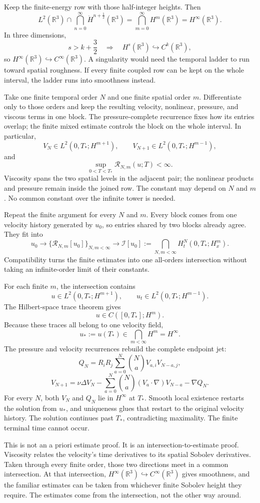\documentclass[11pt]{article}
\begin{document}
Keep the finite-energy row with those half-integer heights. Then
\[
L^2(\mathbb R^3)
\cap\bigcap_{n=0}^{\infty}\dot H^{n+\frac12}(\mathbb R^3)
=\bigcap_{m=0}^{\infty}H^m(\mathbb R^3)
=H^\infty(\mathbb R^3).
\]
In three dimensions,
\[
s>k+\frac32
\quad\Longrightarrow\quad
H^s(\mathbb R^3)\hookrightarrow C^k(\mathbb R^3),
\]
so \(H^\infty(\mathbb R^3)\hookrightarrow C^\infty(\mathbb R^3)\). A singularity would need the temporal ladder to run toward spatial roughness. If every finite coupled row can be kept on the whole interval, the ladder runs into smoothness instead.

Take one finite temporal order \(N\) and one finite spatial order \(m\). Differentiate only to those orders and keep the resulting velocity, nonlinear, pressure, and viscous terms in one block. The pressure-complete recurrence fixes how its entries overlap; the finite mixed estimate controls the block on the whole interval. In particular,
\[
V_N\in L^2(0,T_*;H^{m+1}),
\qquad
V_{N+1}\in L^2(0,T_*;H^{m-1}),
\]
and
\[
\sup_{0<T<T_*}\mathcal R_{N,m}(u;T)<\infty.
\]
Viscosity spans the two spatial levels in the adjacent pair; the nonlinear products and pressure remain inside the joined row. The constant may depend on \(N\) and \(m\). No common constant over the infinite tower is needed.

Repeat the finite argument for every \(N\) and \(m\). Every block comes from one velocity history generated by \(u_0\), so entries shared by two blocks already agree. They fit into
\[
u_0
\longrightarrow
\{\mathcal R_{N,m}[u_0]\}_{N,m<\infty}
\longrightarrow
\mathcal I[u_0]
:=
\bigcap_{N,m<\infty}H_t^N(0,T_*;H_x^m).
\]
Compatibility turns the finite estimates into one all-orders intersection without taking an infinite-order limit of their constants.

For each finite \(m\), the intersection contains
\[
u\in L^2(0,T_*;H^{m+1}),
\qquad
u_t\in L^2(0,T_*;H^{m-1}).
\]
The Hilbert-space trace theorem gives
\[
u\in C([0,T_*];H^m).
\]
Because these traces all belong to one velocity field,
\[
u_*:=u(T_*)\in\bigcap_{m<\infty}H^m=H^\infty.
\]
The pressure and velocity recurrences rebuild the complete endpoint jet:
\[
Q_N
=R_iR_j\sum_{a=0}^{N}\binom NaV_{a,i}V_{N-a,j},
\]
\[
V_{N+1}
=\nu\Delta V_N
-\sum_{a=0}^{N}\binom Na(V_a\cdot\nabla)V_{N-a}
-\nabla Q_N.
\]
For every \(N\), both \(V_N\) and \(Q_N\) lie in \(H^\infty\) at \(T_*\). Smooth local existence restarts the solution from \(u_*\), and uniqueness glues that restart to the original velocity history. The solution continues past \(T_*\), contradicting maximality. The finite terminal time cannot occur.

This is not an a priori estimate proof. It is an intersection-to-estimate proof. Viscosity relates the velocity's time derivatives to its spatial Sobolev derivatives. Taken through every finite order, those two directions meet in a common intersection. At that intersection, \(H^\infty(\mathbb R^3)\hookrightarrow C^\infty(\mathbb R^3)\) gives smoothness, and the familiar estimates can be taken from whichever finite Sobolev height they require. The estimates come from the intersection, not the other way around.
\end{document}
